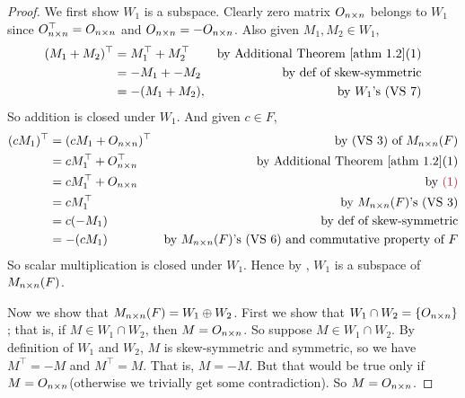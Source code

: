 \begin{proof}
We first show \(W_1\) is a subspace.
Clearly zero matrix \(O_{n \times n}\) belongs to \(W_1\) since \(O^\top_{n \times n} = O_{n \times n}\)  and \(O_{n \times n} = -O_{n \times n}\).
Also given \(M_1, M_2 \in W_1\),
\begin{align*}
    (M_1 + M_2)^\top & = M_1^\top + M_2^\top & \text{by \ATHM{1.2}(1)} \\
                  & = -M_1 + -M_2 & \text{by def of skew-symmetric} \\
                  & = -(M_1 + M_2), & \text{by \(W_1\)'s (VS 7)}
\end{align*}
So addition is closed under \(W_1\).
And given \(c \in F\),
\begin{align*}
    (cM_1)^\top & = (cM_1 + O_{n \X n})^\top & \text{by (VS 3) of \(M_{n \X n}(F)\)} \\
             & = cM_1^\top + O_{n \X n}^\top & \text{by \ATHM{1.2}(1)} \\
             & = cM_1^\top + O_{n \X n} & \text{by \MAROON{(1)}} \\
             & = cM_1^\top & \text{by \(M_{n \X n}(F)\)'s (VS 3)} \\
             & = c(-M_1) & \text{by def of skew-symmetric} \\
             & = -(cM_1) & \text{by \(M_{n \X n}(F)\)'s (VS 6) and commutative property of \(F\)}
\end{align*}
So scalar multiplication is closed under \(W_1\).
Hence by , \(W_1\) is a subspace of \(M_{n \times n}(F)\).

Now we show that \(M_{n \times n}(F) = W_1 \oplus W_2\).
First we show that \(W_1 \cap W_2 = \{ O_{n \times n} \}\);
that is, if \(M \in W_1 \cap W_2\), then \(M = O_{n \times n}\).
So suppose \(M \in W_1 \cap W_2\).
By definition of \(W_1\) and \(W_2\), \(M\) is skew-symmetric and symmetric, so we have \(M^\top = -M\) and \(M^\top = M\).
That is, \(M = -M\).
But that would be true only if \(M = O_{n \times n}\)(otherwise we trivially get some contradiction).
So \(M = O_{n \times n}\).


\end{proof}
